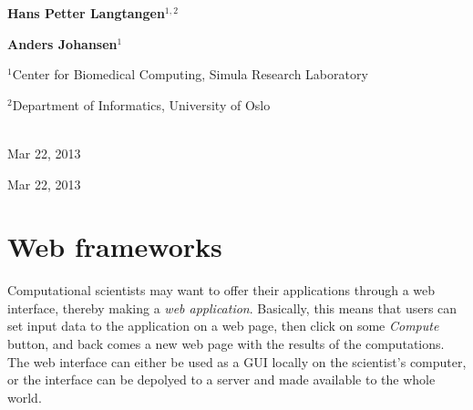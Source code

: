\documentclass[%
oneside,                 %
final,                   %
10pt]{article}
\begin{document}
\begin{center}

\begin{center}
{\bf Hans Petter Langtangen${}^{1, 2}$} \\ [0mm]
\end{center}


\begin{center}
{\bf Anders Johansen${}^{1}$} \\ [0mm]
\end{center}

\begin{center}
\centerline{{\small ${}^1$Center for Biomedical Computing, Simula Research Laboratory}}
\centerline{{\small ${}^2$Department of Informatics, University of Oslo}}
\end{center}




\date{Mar 22, 2013}
\maketitle


\ \\ [10mm]
{\large\textsf{Mar 22, 2013}}

\end{center}
\vfill
\clearpage


\begin{center}
Mar 22, 2013
\end{center}

\vspace{1cm}



\tableofcontents

\vspace{1cm} %






\section{Web frameworks}


Computational scientists may want to offer their applications through
a web interface, thereby making a \emph{web application}.
Basically, this means that users can set input data
to the application on a web page, then click on some \emph{Compute} button,
and back comes a new web page with the results of the computations.
The web interface can either be used as a GUI locally on the
scientist's computer, or the interface can be depolyed to
a server and made available to the whole world.
\end{document}
